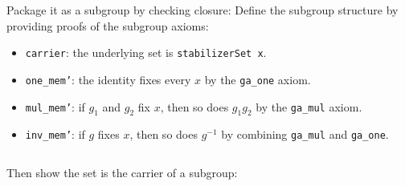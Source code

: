 \documentclass[
  12pt, %
]{assignment}
\newcommand{\leancodeurl}{}
\newcommand{\setleancodeurl}[1]{\renewcommand{\leancodeurl}{#1}}
\newcommand{\leancodefile}[3][]{%
  \setleancodeurl{#3}%
  \inputminted[fontsize=\footnotesize,breaklines,breakanywhere,tabsize=4,showspaces=false,linenos=true,#1]{lean4}{#2}%
}
\begin{document}
Package it as a subgroup by checking closure:
Define the subgroup structure by providing proofs of the subgroup axioms:
\begin{itemize}
	\item \texttt{carrier}: the underlying set is \texttt{stabilizerSet x}.
	\item \texttt{one\_mem'}: the identity fixes every $x$ by the \texttt{ga\_one} axiom.
	\item \texttt{mul\_mem'}: if $g_1$ and $g_2$ fix $x$, then so does $g_1 g_2$ by the
	      \texttt{ga\_mul} axiom.
	\item \texttt{inv\_mem'}: if $g$ fixes $x$, then so does $g^{-1}$ by combining
	      \texttt{ga\_mul} and \texttt{ga\_one}.
\end{itemize}
\leancodefile[firstline=27,lastline=52,firstnumber=27]{../lean/GroupAction/Stabilizer.lean}{https://github.com/FrankieeW/GroupAction/blob/v1.0.0/lean/GroupAction/Stabilizer.lean}

Then show the set is the carrier of a subgroup:
\leancodefile[firstline=54,lastline=57,firstnumber=54]{../lean/GroupAction/Stabilizer.lean}{https://github.com/FrankieeW/GroupAction/blob/v1.0.0/lean/GroupAction/Stabilizer.lean}

\end{document}
